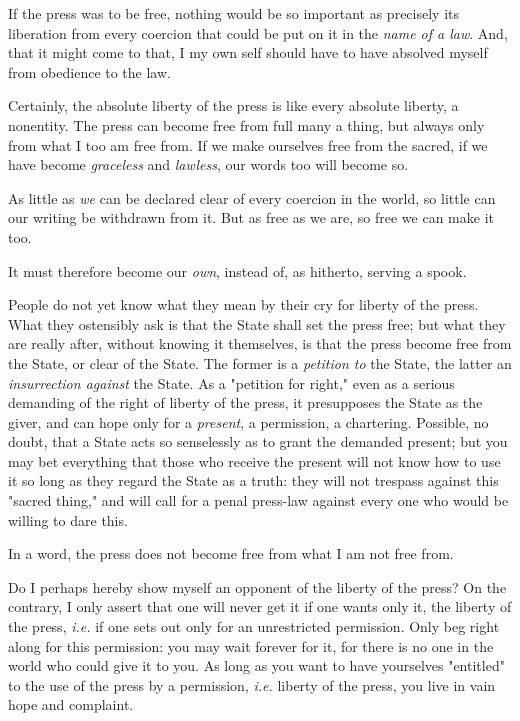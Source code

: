 \documentclass[a4paper]{book}
\begin{document}
If the press was to be free, nothing would be so important as precisely its 
liberation from every coercion that could be put on it in the \textit{name of 
a law}. And, that it might come to that, I my own self should have to have 
absolved myself from obedience to the law.

Certainly, the absolute liberty of the press is like every absolute liberty, a 
nonentity. The press can become free from full many a thing, but always only 
from what I too am free from. If we make ourselves free from the sacred, if we 
have become \textit{graceless} and \textit{lawless}, our words too will become 
so.

As little as \textit{we} can be declared clear of every coercion in the world, 
so little can our writing be withdrawn from it. But as free as we are, so free 
we can make it too.

It must therefore become our \textit{own}, instead of, as hitherto, serving a 
spook.

People do not yet know what they mean by their cry for liberty of the press. 
What they ostensibly ask is that the State shall set the press free; but what 
they are really after, without knowing it themselves, is that the press become 
free from the State, or clear of the State. The former is a \textit{petition 
to} the State, the latter an \textit{insurrection against} the State. As a 
"{}petition for right,"{} even as a serious demanding of the right of liberty 
of the press, it presupposes the State as the giver, and can hope only for a 
\textit{present}, a permission, a chartering. Possible, no doubt, that a State 
acts so senselessly as to grant the demanded present; but you may bet 
everything that those who receive the present will not know how to use it so 
long as they regard the State as a truth: they will not trespass against this 
"{}sacred thing,"{} and will call for a penal press-law against every one who 
would be willing to dare this.

In a word, the press does not become free from what I am not free from.

Do I perhaps hereby show myself an opponent of the liberty of the press? On 
the contrary, I only assert that one will never get it if one wants only it, 
the liberty of the press, \textit{i.e.} if one sets out only for an 
unrestricted permission. Only beg right along for this permission: you may 
wait forever for it, for there is no one in the world who could give it to 
you. As long as you want to have yourselves "{}entitled"{} to the use of the 
press by a permission, \textit{i.e.} liberty of the press, you live in vain 
hope and complaint.
\end{document}
